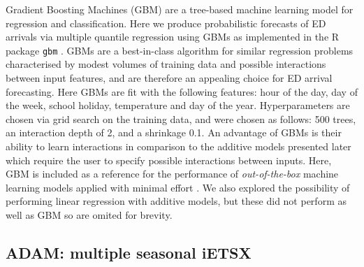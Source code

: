 \documentclass[]{elsarticle} %
\begin{document}
Gradient Boosting Machines (GBM) are a tree-based machine learning model
for regression and classification. Here we produce probabilistic
forecasts of ED arrivals via multiple quantile regression using GBMs as
implemented in the R package \texttt{gbm} \citep{Greenwell2020}. GBMs are a
best-in-class algorithm for similar regression problems characterised by
modest volumes of training data and possible interactions between input
features, and are therefore an appealing choice for ED arrival
forecasting. Here GBMs are fit with the following features: hour of the
day, day of the week, school holiday, temperature and day of the year.
Hyperparameters are chosen via grid search on the training data, and
were chosen as follows: 500 trees, an interaction depth of 2, and a
shrinkage 0.1. An advantage of GBMs is their ability to learn
interactions in comparison to the additive models presented later which
require the user to specify possible interactions between inputs. Here, GBM is included as a reference for the performance of \emph{out-of-the-box}
machine learning models applied with minimal effort \citep{ridgeway2007generalized}. We also explored
the possibility of performing linear regression with additive models,
but these did not perform as well as GBM so are omited for brevity.

\hypertarget{adam-multiple-seasonal-ietsx}{%
\subsection{ADAM: multiple seasonal iETSX}\label{adam-multiple-seasonal-ietsx}}
\end{document}
